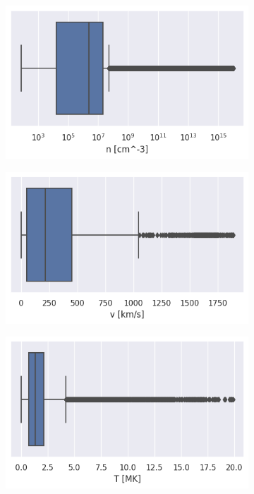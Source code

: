 \begin{figure}[!ht]
     \centering
     \begin{subfigure}[b]{0.32\textwidth}
         \centering
         \includegraphics[width=\textwidth]{figures/volume_bp.png}
     \end{subfigure}
     \hfill
     \begin{subfigure}[b]{0.32\textwidth}
         \centering
         \includegraphics[width=\textwidth]{figures/velocity_bp.png}
     \end{subfigure}
     \hfill
     \begin{subfigure}[b]{0.32\textwidth}
         \centering
         \includegraphics[width=\textwidth]{figures/temperature_bp.png}

\end{subfigure}
\end{figure}
